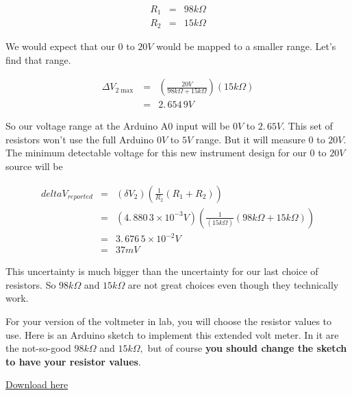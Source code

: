 \begin{eqnarray*}
	R_{1} &=&98\unit{k\Omega} \\
	R_{2} &=&15\unit{k\Omega}
\end{eqnarray*}

We would expect that our $0$ to $20\unit{V}$ would be mapped to a smaller range. Let's find that range.

\begin{eqnarray*}
	\Delta V_{2\max } &=&\left( \frac{20\unit{V}}{98\unit{k\Omega}+15\unit{k\Omega}}\right) \left( 15\unit{k\Omega}\right) \\
                      &=&2.\,\allowbreak 654\,9\unit{V}
\end{eqnarray*}

So our voltage range at the Arduino A0 input will be $0\unit{V}$ to $ 2.\,\allowbreak 65\unit{V}.$ This set of resistors won't use the full Arduino $0\unit{V}$ to $5\unit{V}$ range. But it will measure $0$ to $20 \unit{V}.$ The minimum detectable voltage for this new instrument design for
our $0$ to $20\unit{V}$ source will be 

\begin{eqnarray*}
	delta V_{reported} &=&\left( \delta V_{2}\right) \left( \frac{1}{R_{2}}\left( R_{1}+R_{2}\right) \right) \\
                       &=&\left( 4.\,\allowbreak 880\,3\times 10^{-3}\unit{V}\right) \left( \frac{1}{\left( 15\unit{k\Omega}\right) }\left( 98\unit{k\Omega}+15\unit{k\Omega}\right) \right) \\
                       &=&3.\,\allowbreak 676\,5\times 10^{-2}\unit{V} \\
                       &=&37\unit{mV}
\end{eqnarray*}

This uncertainty is much bigger than the uncertainty for our last choice of resistors. So $98\unit{k\Omega}$ and $15\unit{k\Omega}$ are not great choices even though they technically work.

For your version of the voltmeter in lab, you will choose the resistor values to use. Here is an Arduino sketch to implement this extended volt meter. In it are the not-so-good $98\unit{k\Omega}$ and $15\unit{k\Omega},$ but of course \textbf{you should change the sketch to have your resistor
values}.

\href{https://dtoliphant.github.io/PH250Manual/Code/DAQ_Extended_voltmeter.ino}{Download here}



